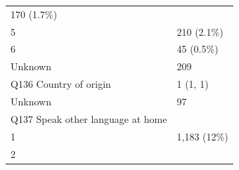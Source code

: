 \documentclass[]{article}
\begin{document}
\begin{longtable}[]{@{}ll@{}}
\begin{minipage}[t]{0.23\columnwidth}
170 (1.7\%)\strut
\end{minipage}\tabularnewline
\begin{minipage}[t]{0.71\columnwidth}\raggedright
5\strut
\end{minipage} & \begin{minipage}[t]{0.23\columnwidth}\raggedright
210 (2.1\%)\strut
\end{minipage}\tabularnewline
\begin{minipage}[t]{0.71\columnwidth}\raggedright
6\strut
\end{minipage} & \begin{minipage}[t]{0.23\columnwidth}\raggedright
45 (0.5\%)\strut
\end{minipage}\tabularnewline
\begin{minipage}[t]{0.71\columnwidth}\raggedright
Unknown\strut
\end{minipage} & \begin{minipage}[t]{0.23\columnwidth}\raggedright
209\strut
\end{minipage}\tabularnewline
\begin{minipage}[t]{0.71\columnwidth}\raggedright
Q136 Country of origin\strut
\end{minipage} & \begin{minipage}[t]{0.23\columnwidth}\raggedright
1 (1, 1)\strut
\end{minipage}\tabularnewline
\begin{minipage}[t]{0.71\columnwidth}\raggedright
Unknown\strut
\end{minipage} & \begin{minipage}[t]{0.23\columnwidth}\raggedright
97\strut
\end{minipage}\tabularnewline
\begin{minipage}[t]{0.71\columnwidth}\raggedright
Q137 Speak other language at home\strut
\end{minipage} & \begin{minipage}[t]{0.23\columnwidth}\raggedright
\strut
\end{minipage}\tabularnewline
\begin{minipage}[t]{0.71\columnwidth}\raggedright
1\strut
\end{minipage} & \begin{minipage}[t]{0.23\columnwidth}\raggedright
1,183 (12\%)\strut
\end{minipage}\tabularnewline
\begin{minipage}[t]{0.71\columnwidth}\raggedright
2\strut
\end{minipage} & \begin{minipage}[t]{0.23\columnwidth}\raggedright

\end{minipage}
\end{longtable}
\end{document}
